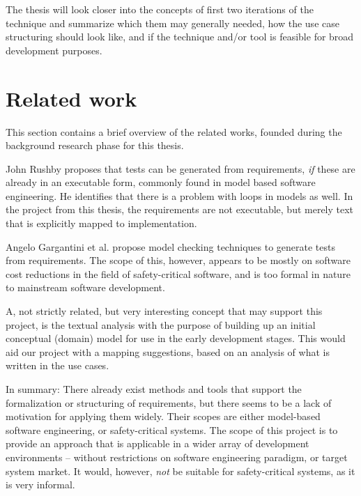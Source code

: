\noindent The thesis will look closer into the concepts of first two iterations of the technique and summarize which them may generally needed, how the use case structuring should look like, and if the technique and/or tool is feasible for broad development purposes.\medskip

\section{Related work}
This section contains a brief overview of the related works, founded during the background research phase for this thesis.\medskip

\noindent John Rushby\cite{rushby2008automated} proposes that tests can be generated from requirements, \emph{if} these are already in an executable form, commonly found in model based software engineering. He identifies that there is a problem with loops in models as well. In the project from this thesis, the requirements are not executable, but merely text that is explicitly mapped to implementation.\medskip

\noindent Angelo Gargantini et al. propose model checking techniques to generate tests from requirements\cite{gargantini1999using}. The scope of this, however, appears to be mostly on software cost reductions in the field of safety-critical software, and is too formal in nature to mainstream software development.\medskip

\noindent A, not strictly related, but very interesting concept that may support this project, is the textual analysis with the purpose of building up an initial conceptual (domain) model for use in the early development stages\cite{kop2010natural}. This would aid our project with a mapping suggestions, based on an analysis of what is written in the use cases.\medskip

\noindent In summary: There already exist methods and tools that support the formalization or structuring of requirements, but there seems to be a lack of motivation for applying them widely. Their scopes are either model-based software engineering, or safety-critical systems. The scope of this project is to provide an approach that is applicable in a wider array of development environments -- without restrictions on software engineering paradigm, or target system market. It would, however, \emph{not} be suitable for safety-critical systems, as it is very informal.